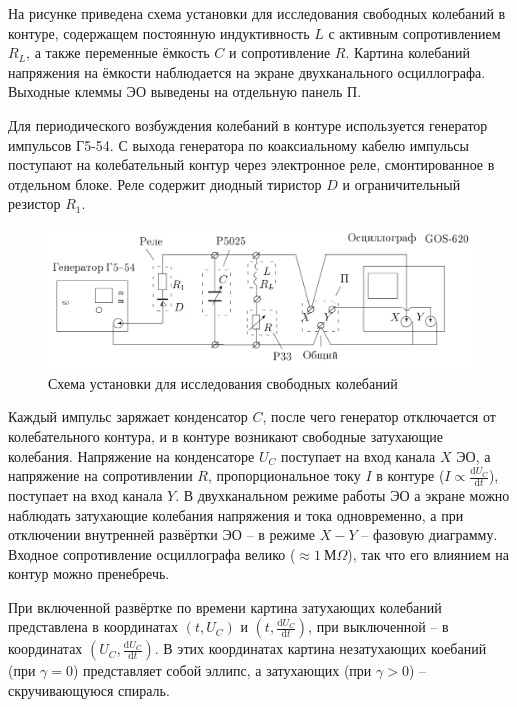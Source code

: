 \documentclass[a4paper,10pt]{article}
\begin{document}
На рисунке  приведена схема установки для исследования свободных колебаний в контуре, содержащем постоянную индуктивность $L$ с активным сопротивлением $R_L$, а также переменные ёмкость $C$ и сопротивление $R$. Картина колебаний напряжения на ёмкости наблюдается на экране двухканального осциллографа. Выходные клеммы ЭО выведены на отдельную панель П.

Для периодического возбуждения колебаний в контуре используется генератор импульсов Г5-54. С выхода генератора по коаксиальному кабелю импульсы поступают на колебательный контур через электронное реле, смонтированное в отдельном блоке. Реле содержит диодный тиристор $D$ и ограничительный резистор $R_1$.

\begin{figure}[h]
	\centering
	\includegraphics[scale=0.25]{Device}
	\caption{Схема установки для исследования свободных колебаний} \label{Device}
\end{figure}

Каждый импульс заряжает конденсатор $C$, после чего генератор отключается от колебательного контура, и в контуре возникают свободные затухающие колебания. Напряжение на конденсаторе $U_C$ поступает на вход канала $X$ ЭО, а напряжение на сопротивлении $R$, пропорциональное току $I$ в контуре ($I\propto\frac{\text{d}U_C}{\text{d}t}$), поступает на вход канала $Y$. В двухканальном режиме работы ЭО а экране можно наблюдать затухающие колебания напряжения и тока одновременно, а при отключении внутренней развёртки ЭО -- в режиме $X-Y$ -- фазовую диаграмму. Входное сопротивление осциллографа велико ($\approx1~\text{М}\Omega$), так что его влиянием на контур можно пренебречь.

При включенной развёртке по времени картина затухающих колебаний представлена в координатах $(t,U_C)$ и $(t,\frac{\text{d}U_C}{\text{d}t})$, при выключенной -- в координатах $(U_C,\frac{\text{d}U_C}{\text{d}t})$. В этих координатах картина незатухающих коебаний (при $\gamma=0$) представляет собой эллипс, а затухающих (при $\gamma > 0$) -- скручивающуюся спираль.
\end{document}
